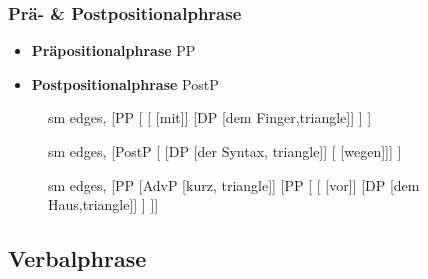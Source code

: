 \begin{frame}
\frametitle{Prä- \& Postpositionalphrase}

\begin{itemize}
	\item \textbf{Präpositionalphrase} \ras PP
	\item \textbf{Postpositionalphrase} \ras PostP
\end{itemize}

\begin{figure}[b]
  	\begin{minipage}[b]{0.30\textwidth}
	\centering
	\footnotesize{
		\begin{forest}
		sm edges,
		[PP [
				[ [mit]]
				[DP [dem Finger,triangle]]
			]
		]
		\end{forest}
		}
  	\end{minipage}  
  	\pause            
	\begin{minipage}[b]{0.30\textwidth}
	\centering
	\footnotesize{
		\begin{forest}
		sm edges,
		[PostP [ [DP [der Syntax, triangle]]
							[\zerobar{Post} [wegen]]]
		]	 
		\end{forest}
		}
  	\end{minipage}
 	\pause            
	\begin{minipage}[b]{0.30\textwidth}
	\centering
	\footnotesize{
		\begin{forest}
		sm edges,
		[PP
		[AdvP [kurz, triangle]]
		[PP [\MyPxbar{P}
				[\zerobar{P} [vor]]
				[DP [dem Haus,triangle]]
			]
		]]
		\end{forest}
		}
  	\end{minipage}  
\end{figure}
\end{frame}


\subsection{Verbalphrase}

